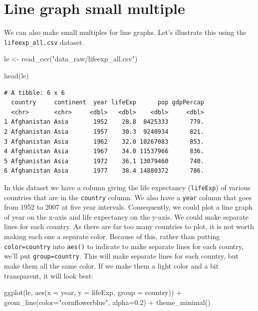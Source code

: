 \documentclass[
  letterpaper,
  DIV=11,
  numbers=noendperiod]{scrreprt}
\newenvironment{Shaded}{\begin{snugshade}}{\end{snugshade}}
\newcommand{\AttributeTok}[1]{\textcolor[rgb]{0.40,0.45,0.13}{#1}}
\newcommand{\FloatTok}[1]{\textcolor[rgb]{0.68,0.00,0.00}{#1}}
\newcommand{\FunctionTok}[1]{\textcolor[rgb]{0.28,0.35,0.67}{#1}}
\newcommand{\NormalTok}[1]{\textcolor[rgb]{0.00,0.23,0.31}{#1}}
\newcommand{\OtherTok}[1]{\textcolor[rgb]{0.00,0.23,0.31}{#1}}
\newcommand{\SpecialCharTok}[1]{\textcolor[rgb]{0.37,0.37,0.37}{#1}}
\newcommand{\StringTok}[1]{\textcolor[rgb]{0.13,0.47,0.30}{#1}}
\begin{document}
\hypertarget{line-graph-small-multiple}{%
\section{\texorpdfstring{\textbf{Line graph small
multiple}}{Line graph small multiple}}\label{line-graph-small-multiple}}

We can also make small multiples for line graphs. Let's illustrate this
using the \texttt{lifeexp\_all.csv} dataset.

\begin{Shaded}
\begin{Highlighting}[]
\NormalTok{le }\OtherTok{\textless{}{-}} \FunctionTok{read\_csv}\NormalTok{(}\StringTok{"data\_raw/lifeexp\_all.csv"}\NormalTok{)}

\FunctionTok{head}\NormalTok{(le)}
\end{Highlighting}
\end{Shaded}

\begin{verbatim}
# A tibble: 6 x 6
  country     continent  year lifeExp      pop gdpPercap
  <chr>       <chr>     <dbl>   <dbl>    <dbl>     <dbl>
1 Afghanistan Asia       1952    28.8  8425333      779.
2 Afghanistan Asia       1957    30.3  9240934      821.
3 Afghanistan Asia       1962    32.0 10267083      853.
4 Afghanistan Asia       1967    34.0 11537966      836.
5 Afghanistan Asia       1972    36.1 13079460      740.
6 Afghanistan Asia       1977    38.4 14880372      786.
\end{verbatim}

In this dataset we have a column giving the life expectancy
(\texttt{lifeExp}) of various countries that are in the \texttt{country}
column. We also have a \texttt{year} column that goes from 1952 to 2007
at five year intervals. Consequently, we could plot a line graph of year
on the x-axis and life expectancy on the y-axis. We could make separate
lines for each country. As there are far too many countries to plot, it
is not worth making each one a separate color. Because of this, rather
than putting \texttt{color=country} into \texttt{aes()} to indicate to
make separate lines for each country, we'll put \texttt{group=country}.
This will make separate lines for each country, but make them all the
same color. If we make them a light color and a bit transparent, it will
look best:

\begin{Shaded}
\begin{Highlighting}[]
\FunctionTok{ggplot}\NormalTok{(le, }\FunctionTok{aes}\NormalTok{(}\AttributeTok{x =}\NormalTok{ year, }\AttributeTok{y =}\NormalTok{ lifeExp, }\AttributeTok{group =}\NormalTok{ country)) }\SpecialCharTok{+} 
  \FunctionTok{geom\_line}\NormalTok{(}\AttributeTok{color=}\StringTok{"cornflowerblue"}\NormalTok{, }\AttributeTok{alpha=}\FloatTok{0.2}\NormalTok{) }\SpecialCharTok{+}
  \FunctionTok{theme\_minimal}\NormalTok{()}
\end{Highlighting}
\end{Shaded}
\end{document}
